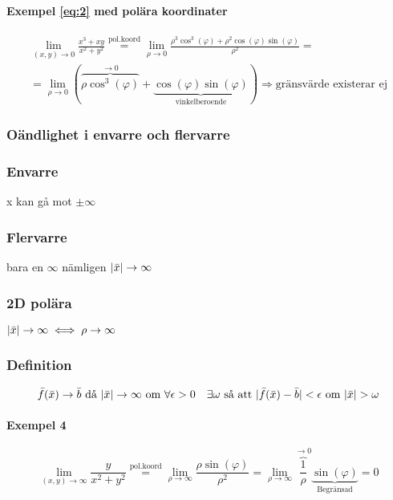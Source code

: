 \documentclass{article}
\DeclarePairedDelimiter \abs{\lvert}{\rvert}
\begin{document}
\paragraph{Exempel \eqref{eq:2} med polära koordinater}

\[
\begin{split}
\lim_{(x,y) \rightarrow 0} \frac{x^3+xy}{x^2+y^2} \overset{\mathrm{pol.koord}}{=} \lim_{\rho \rightarrow 0} \frac{\rho^3 \cos^3(\varphi) + \rho^2 \cos(\varphi) \sin(\varphi)}{\rho^2} = \\
=\lim_{\rho \rightarrow 0} (\overbrace{\rho \cos^3(\varphi)}^{\rightarrow 0}+\underbrace{\cos(\varphi) \sin(\varphi)}_\text{vinkelberoende}) \Rightarrow \text{gränsvärde existerar ej}
\end{split}
\]

\subsubsection{Oändlighet i envarre och flervarre}
\subsubsection*{Envarre}
x kan gå mot $\pm\infty$
\subsubsection*{Flervarre}
bara en $\infty$ nämligen $\abs{\bar{x}} \rightarrow \infty$
\subsubsection*{2D polära}
$\abs{\bar{x}} \rightarrow \infty \iff \rho \rightarrow \infty$
\subsubsection{Definition}
\[
	\bar{f}(\bar{x}) \rightarrow \bar{b} \text{ då } \abs{\bar{x}} \rightarrow \infty \text{ om } \forall \epsilon > 0 \quad \exists \omega \text{ så att } \abs{\bar{f}(\bar{x}) - \bar{b}} < \epsilon \text{ om } \abs{\bar{x}} > \omega
\]

\newpage
\paragraph{Exempel 4}

\begin{equation} \label{eq:4}
	\lim_{(x,y) \rightarrow \infty} \frac{y}{x^2+y^2} \overset{\mathrm{pol.koord}}{=} \lim_{\rho \rightarrow \infty} \frac{\rho \sin(\varphi)}{\rho^2} = \lim_{\rho \rightarrow \infty} \overbrace{\frac{1}{\rho}}^{\rightarrow 0} \underbrace{\sin(\varphi)}_\text{Begränsad} = 0
\end{equation}
\end{document}
